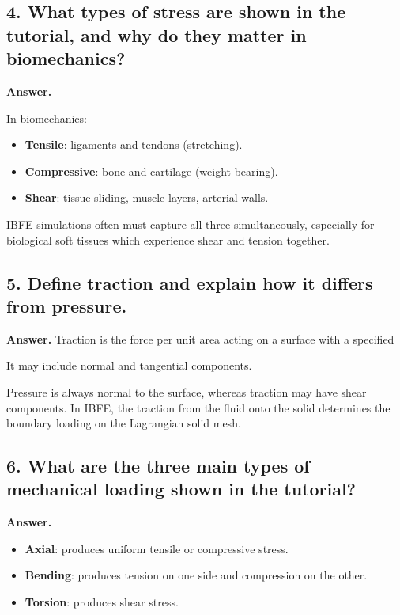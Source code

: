\documentclass[12pt]{article}
\begin{document}
\subsection*{4. What types of stress are shown in the tutorial, and why do they matter in biomechanics?}

\textbf{Answer.}


In biomechanics:
\begin{itemize}
    \item \textbf{Tensile}: ligaments and tendons (stretching).
    \item \textbf{Compressive}: bone and cartilage (weight-bearing).
    \item \textbf{Shear}: tissue sliding, muscle layers, arterial walls.
\end{itemize}
IBFE simulations often must capture all three simultaneously, especially
for biological soft tissues which experience shear and tension together.


\subsection*{5. Define traction and explain how it differs from pressure.}

\textbf{Answer.}
Traction is the force per unit area acting on a surface with a specified

It may include normal and tangential components.

Pressure is always normal to the surface, whereas traction may have 
shear components.  
In IBFE, the traction from the fluid onto the solid determines the
boundary loading on the Lagrangian solid mesh.


\subsection*{6. What are the three main types of mechanical loading shown in the tutorial?}

\textbf{Answer.}


\begin{itemize}
    \item \textbf{Axial}: produces uniform tensile or compressive stress.
    \item \textbf{Bending}: produces tension on one side and compression on the other.
    \item \textbf{Torsion}: produces shear stress.
\end{itemize}
\end{document}
